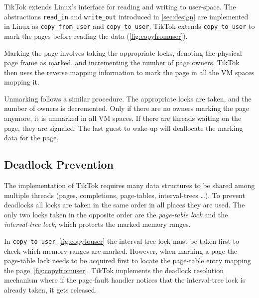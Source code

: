 \documentclass[conference]{IEEEtran}
\newcommand{\sysname}{TikTok}
\begin{document}
\sysname{} extends Linux's interface for reading and writing to user-space. The
abstractions \texttt{read\_in} and \texttt{write\_out} introduced in
\autoref{sec:design} are implemented in Linux as \texttt{copy\_from\_user} and
\texttt{copy\_to\_user}. \sysname{} extends \texttt{copy\_to\_user} to mark the pages
before reading the data (\autoref{fig:copyfromuser}).

Marking the page involves taking the appropriate locks, denoting the physical
page frame as marked, and incrementing the number of page owners. \sysname{} then
uses the reverse mapping information to mark the page in all the VM spaces
mapping it.

Unmarking follows a similar procedure. The appropriate locks are taken, and the
number of owners is decremented. Only if there are no owners marking the page
anymore, it is unmarked in all VM spaces. If there are threads waiting on the
page, they are signaled. The last guest to wake-up will deallocate the marking
data for the page.

\subsection{Deadlock Prevention}
\label{subsec:deadlockprevention}
The implementation of \sysname{} requires many data structures to be shared
among multiple threads (pages, completions, page-tables, interval-trees \ldots).
To prevent deadlocks all locks are taken in the same order in all places they
are used. The only two locks taken in the opposite order are the
\emph{page-table lock} and the \emph{interval-tree lock}, which protects the marked
memory ranges.

In \texttt{copy\_to\_user}~\autoref{fig:copytouser} the interval-tree lock must
be taken first to check which memory ranges are marked. However, when marking a
page the page-table lock needs to be acquired first to locate the page-table
entry mapping the page~\autoref{fig:copyfromuser}. \sysname{} implements the
deadlock resolution mechanism where if the page-fault handler notices that the
interval-tree lock is already taken, it gets released.
\end{document}
